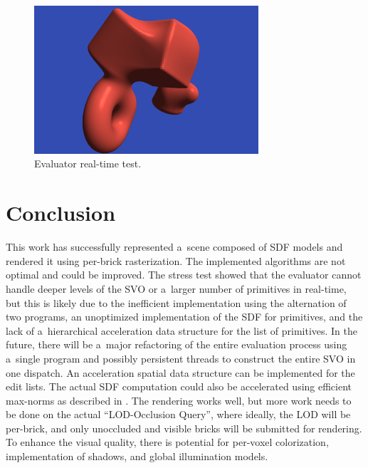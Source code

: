 \documentclass[11pt, a4paper]{article}
\renewcommand{\uv}[1]{``#1''}
\begin{document}
\begin{figure}
    \centering
    \includegraphics[height=5.5cm]{floating.png}
    \caption{Evaluator real-time test.}
    \label{floating}
\end{figure}


\section{Conclusion}

This work has successfully represented a~scene composed of SDF models and rendered it using per-brick rasterization.
The implemented algorithms are not optimal and could be improved.
The stress test showed that the evaluator cannot handle deeper levels of the SVO or a~larger number of primitives in real-time, but this is likely due to the inefficient implementation using the alternation of two programs, an unoptimized implementation of the SDF for primitives, and the lack of a~hierarchical acceleration data structure for the list of primitives.
In the future, there will be a~major refactoring of the entire evaluation process using a~single program and possibly persistent threads to construct the entire SVO in one dispatch.
An acceleration spatial data structure can be implemented for the edit lists.
The actual SDF computation could also be accelerated using efficient max-norms as described in \cite{gokul2003}.
The rendering works well, but more work needs to be done on the actual \uv{LOD-Occlusion Query}, where ideally, the LOD will be per-brick, and only unoccluded and visible bricks will be submitted for rendering.
To enhance the visual quality, there is potential for per-voxel colorization, implementation of shadows, and global illumination models.


\begin{flushleft}
  
\end{flushleft}

\end{document}
